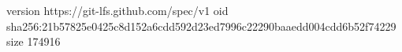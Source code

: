 version https://git-lfs.github.com/spec/v1
oid sha256:21b57825e0425c8d152a6cdd592d23ed7996c22290baaedd004cdd6b52f74229
size 174916
